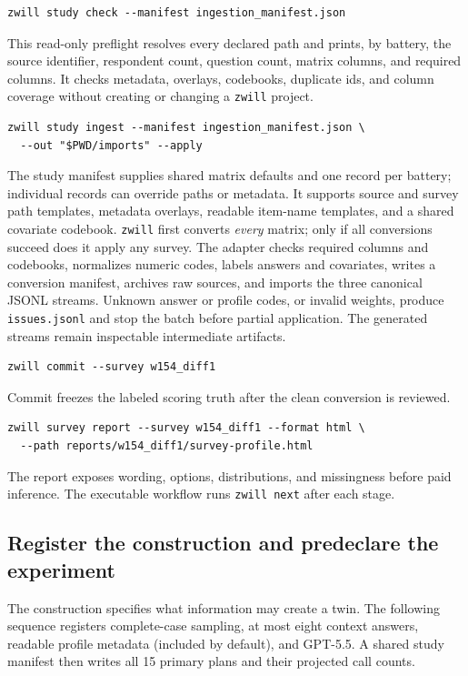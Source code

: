 \documentclass[11pt]{article}
\newcommand{\zwill}{\texttt{zwill}}
\begin{document}
\begin{lstlisting}[style=shell]
zwill study check --manifest ingestion_manifest.json
\end{lstlisting}
This read-only preflight resolves every declared path and prints, by battery,
the source identifier, respondent count, question count, matrix columns, and
required columns. It checks metadata, overlays, codebooks, duplicate ids, and
column coverage without creating or changing a \zwill{} project.

\begin{lstlisting}[style=shell]
zwill study ingest --manifest ingestion_manifest.json \
  --out "$PWD/imports" --apply
\end{lstlisting}
The study manifest supplies shared matrix defaults and one record per battery;
individual records can override paths or metadata. It supports source and
survey path templates, metadata overlays, readable item-name templates, and a
shared covariate codebook. \zwill{} first converts \emph{every} matrix; only if
all conversions succeed does it apply any survey. The adapter checks required
columns and codebooks, normalizes numeric codes, labels answers and covariates,
writes a conversion manifest, archives raw sources, and imports the three
canonical JSONL streams. Unknown answer or profile codes, or invalid weights,
produce \texttt{issues.jsonl} and stop the batch before partial application.
The generated streams remain inspectable intermediate artifacts.

\begin{lstlisting}[style=shell]
zwill commit --survey w154_diff1
\end{lstlisting}
Commit freezes the labeled scoring truth after the clean conversion is reviewed.

\begin{lstlisting}[style=shell]
zwill survey report --survey w154_diff1 --format html \
  --path reports/w154_diff1/survey-profile.html
\end{lstlisting}
The report exposes wording, options, distributions, and missingness before paid
inference. The executable workflow runs \texttt{zwill next} after each stage.

\subsection{Register the construction and predeclare the experiment}
The construction specifies what information may create a twin. The following
sequence registers complete-case sampling, at most eight context answers,
readable profile metadata (included by default), and GPT-5.5. A shared study
manifest then writes all 15 primary plans and their projected call counts.
\end{document}
